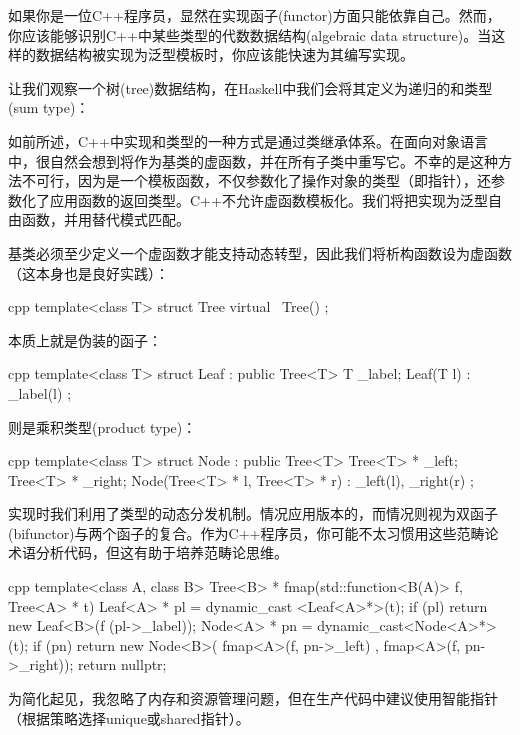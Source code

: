 如果你是一位C++程序员，显然在实现函子(functor)方面只能依靠自己。然而，你应该能够识别C++中某些类型的代数数据结构(algebraic data structure)。当这样的数据结构被实现为泛型模板时，你应该能快速为其编写实现。

让我们观察一个树(tree)数据结构，在Haskell中我们会将其定义为递归的和类型(sum type)：

如前所述，C++中实现和类型的一种方式是通过类继承体系。在面向对象语言中，很自然会想到将作为基类的虚函数，并在所有子类中重写它。不幸的是这种方法不可行，因为是一个模板函数，不仅参数化了操作对象的类型（即指针），还参数化了应用函数的返回类型。C++不允许虚函数模板化。我们将把实现为泛型自由函数，并用替代模式匹配。

基类必须至少定义一个虚函数才能支持动态转型，因此我们将析构函数设为虚函数（这本身也是良好实践）：

\begin{snip}{cpp}
template<class T>
struct Tree {
    virtual ~Tree() {}
};
\end{snip}
本质上就是伪装的函子：

\begin{snip}{cpp}
template<class T>
struct Leaf : public Tree<T> {
    T _label;
    Leaf(T l) : _label(l) {}
};
\end{snip}
则是乘积类型(product type)：

\begin{snip}{cpp}
template<class T>
struct Node : public Tree<T> {
    Tree<T> * _left;
    Tree<T> * _right;
    Node(Tree<T> * l, Tree<T> * r) : _left(l), _right(r) {}
};
\end{snip}
实现时我们利用了类型的动态分发机制。情况应用版本的，而情况则视为双函子(bifunctor)与两个函子的复合。作为C++程序员，你可能不太习惯用这些范畴论术语分析代码，但这有助于培养范畴论思维。

\begin{snip}{cpp}
template<class A, class B>
Tree<B> * fmap(std::function<B(A)> f, Tree<A> * t) {
    Leaf<A> * pl = dynamic_cast <Leaf<A>*>(t);
    if (pl)
        return new Leaf<B>(f (pl->_label));
    Node<A> * pn = dynamic_cast<Node<A>*>(t);
    if (pn)
        return new Node<B>( fmap<A>(f, pn->_left)
                          , fmap<A>(f, pn->_right));
    return nullptr;
}
\end{snip}
为简化起见，我忽略了内存和资源管理问题，但在生产代码中建议使用智能指针（根据策略选择unique或shared指针）。

